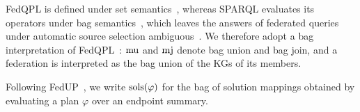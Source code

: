 FedQPL is defined under set semantics~\cite{cheng2020fedqpl}, whereas SPARQL evaluates its operators under bag semantics~\cite{w3SPARQLQuery},
which leaves the answers of federated queries under automatic source selection ambiguous~\cite{tam2026strengthening}.
We therefore adopt a bag interpretation of FedQPL~\cite{tam2026bag}:
$\operatorname{mu}$ and $\operatorname{mj}$ denote bag union and bag join,
and a federation is interpreted as the bag union of the \acp{KG} of its members.

Following FedUP~\cite{aimonierdavat:hal-04538238}, we write $\operatorname{sols}(\varphi)$ for the bag of solution mappings obtained by evaluating a plan $\varphi$ over an endpoint summary.

